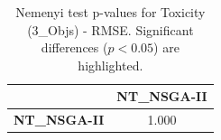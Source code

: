 \begin{table}[h!]
\centering
\scriptsize
\begin{tabular}{lc}
\toprule
 & NT\_NSGA-II \\
\midrule
\textbf{NT\_NSGA-II} & 1.000 \\
\bottomrule
\end{tabular}
\caption{Nemenyi test p-values for Toxicity (3_Objs) - RMSE. Significant differences ($p < 0.05$) are highlighted.}
\label{tab:nemenyi_nemenyi_Toxicity_3_Objs_Test_RMSE}
\end{table}